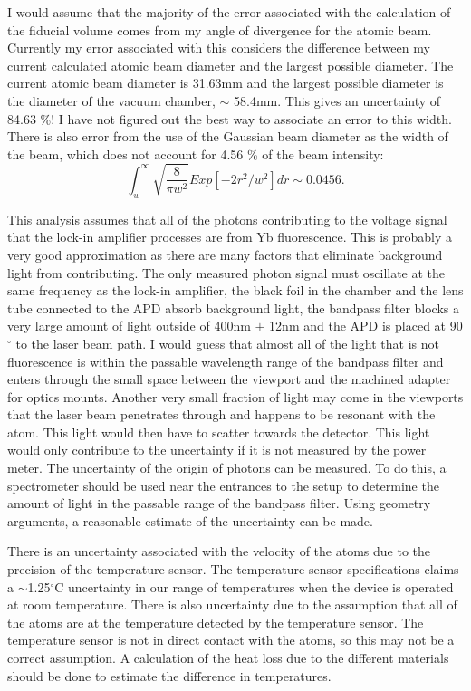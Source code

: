 \documentclass[12pt, a4paper]{article}
\begin{document}
I would assume that the majority of the error associated with the calculation of the fiducial volume comes from my angle of divergence for the atomic beam. Currently my error associated with this considers the difference between my current calculated atomic beam diameter and the largest possible diameter. The current atomic beam diameter is 31.63mm and the largest possible diameter is the diameter of the vacuum chamber, $\sim$ 58.4mm. This gives an uncertainty of 84.63 \%! I have not figured out the best way to associate an error to this width. There is also error from the use of the Gaussian beam diameter as the width of the beam, which does not account for 4.56 \% of the beam intensity:
\begin{equation}
\int_{w}^{\infty} \sqrt{\frac{8}{\pi w^2}} Exp[-2r^2/w^2]dr \sim 0.0456.
\end{equation}

This analysis assumes that all of the photons contributing to the voltage signal that the lock-in amplifier processes are from Yb fluorescence. This is probably a very good approximation as there are many factors that eliminate background light from contributing. The only measured photon signal must oscillate at the same frequency as the lock-in amplifier, the black foil in the chamber and the lens tube connected to the APD absorb background light, the bandpass filter blocks a very large amount of light outside of 400nm $\pm$ 12nm and the APD is placed at 90$^{\circ}$ to the laser beam path. I would guess that almost all of the light that is not fluorescence is within the passable wavelength range of the bandpass filter and enters through the small space between the viewport and the machined adapter for optics mounts. Another very small fraction of light may come in the viewports that the laser beam penetrates through and happens to be resonant with the atom. This light would then have to scatter towards the detector. This light would only contribute to the uncertainty if it is not measured by the power meter. The uncertainty of the origin of photons can be measured. To do this, a spectrometer should be used near the entrances to the setup to determine the amount of light in the passable range of the bandpass filter. Using geometry arguments, a reasonable estimate of the uncertainty can be made.

There is an uncertainty associated with the velocity of the atoms due to the precision of the temperature sensor. The temperature sensor specifications claims a $\sim$1.25$^{\circ}$C  uncertainty in our range of temperatures when the device is operated at room temperature. There is also uncertainty due to the assumption that all of the atoms are at the temperature detected by the temperature sensor. The temperature sensor is not in direct contact with the atoms, so this may not be a correct assumption. A calculation of the heat loss due to the different materials should be done to estimate the difference in temperatures.
\end{document}
